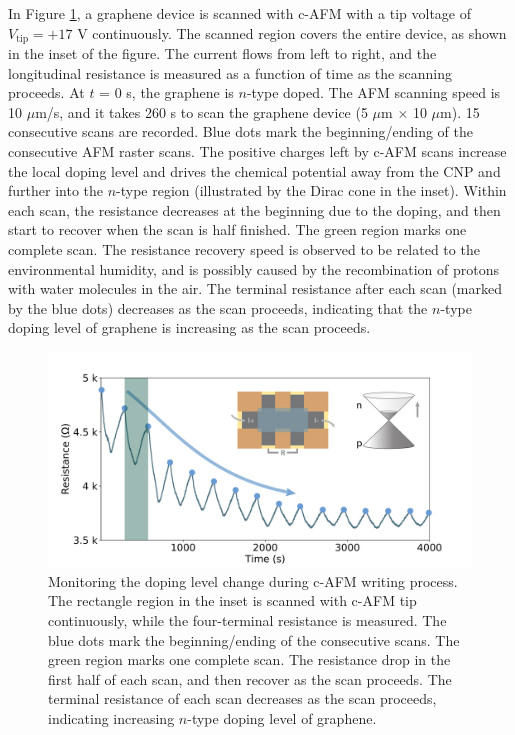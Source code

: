 \documentclass[pdflatex, sectionletters, 12pt]{pittetd}    %
\begin{document}
In Figure \ref{FIG:WritingResistance}, a graphene device is scanned with c-AFM with a tip voltage of $V_\mathrm{tip} = +17$ V continuously. The scanned region covers the entire device, as shown in the inset of the figure. The current flows from left to right, and the longitudinal resistance is measured as a function of time as the scanning proceeds. At $t$ = 0 s, the graphene is $n$-type doped. The AFM scanning speed is 10 $\mu$m/s, and it takes 260 s to scan the graphene device (5 $\mu$m $\times$ 10 $\mu$m). 15 consecutive scans are recorded. Blue dots mark the beginning/ending of the consecutive AFM raster scans. The positive charges left by c-AFM scans increase the local doping level and drives the chemical potential away from the CNP and further into the $n$-type region (illustrated by the Dirac cone in the inset). Within each scan, the resistance decreases at the beginning due to the doping, and then start to recover when the scan is half finished. The green region marks one complete scan. The resistance recovery speed is observed to be related to the environmental humidity, and is possibly caused by the recombination of protons with water molecules in the air. The terminal resistance after each scan (marked by the blue dots) decreases as the scan proceeds, indicating that the $n$-type doping level of graphene is increasing as the scan proceeds.
\\

\begin{figure}[h!]
	\centering
	\includegraphics[width=1\textwidth]{Drawing/WritingResistance.pdf}
	\caption{Monitoring the doping level change during c-AFM writing process. The rectangle region in the inset is scanned with c-AFM tip continuously, while the four-terminal resistance is measured. The blue dots mark the beginning/ending of the consecutive scans. The green region marks one complete scan. The resistance drop in the first half of each scan, and then recover as the scan proceeds. The terminal resistance of each scan decreases as the scan proceeds, indicating increasing $n$-type doping level of graphene.}
	\label{FIG:WritingResistance}
\end{figure}
\end{document}
